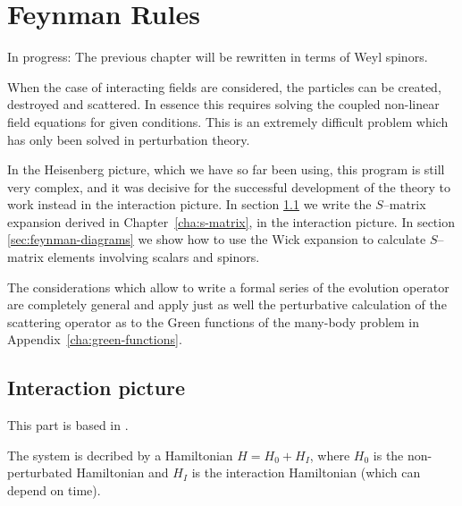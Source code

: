 
\chapter{Feynman Rules}
\label{chap:fr} %
In progress: The previous chapter will be rewritten in terms of Weyl spinors.

When the case of interacting fields are considered, the particles can be created, destroyed and scattered. In essence this requires solving the coupled non-linear field equations for given conditions. This is an extremely difficult problem which has only been solved in perturbation theory.

In the Heisenberg picture, which we have so far been using, this program is still very complex, and it was decisive for the successful development of the theory to work instead in the interaction picture. In section \ref{sec:interaction-picture} we write the $S$--matrix expansion derived in Chapter~\ref{cha:s-matrix}, in the interaction picture. In section \ref{sec:feynman-diagrams} we show how to use the Wick expansion to calculate $S$--matrix elements involving scalars and spinors.

The considerations which allow to write a formal series of the
evolution operator are completely general and apply just as well the
perturbative calculation of the scattering operator as to the Green
functions of the many-body problem in Appendix~\ref{cha:green-functions}.


\section{Interaction picture}
\label{sec:interaction-picture}
This part is based in \cite{Mandl:1985bg}. 

The system is decribed by a Hamiltonian $H=H_0+H_I$, where $H_{0}$ is the non-perturbated Hamiltonian and $H_I$ is the interaction Hamiltonian (which can depend on time). 

